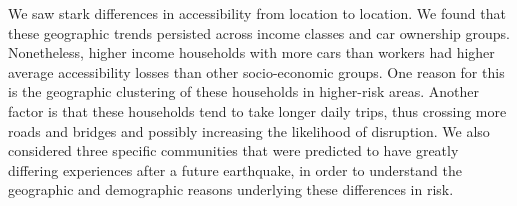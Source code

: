 %


We saw stark differences in accessibility from location to location. We found that these geographic trends persisted across income classes and car ownership groups. Nonetheless, higher income households with more cars than workers had higher average accessibility losses than other socio-economic groups. One reason for this is the geographic clustering of these households in higher-risk areas. Another factor is that these households tend to take longer daily trips, thus crossing more roads and bridges and possibly increasing the likelihood of disruption. We also considered three specific communities that were predicted to have greatly differing experiences after a future earthquake, in order to understand the geographic and demographic reasons underlying these differences in risk.

